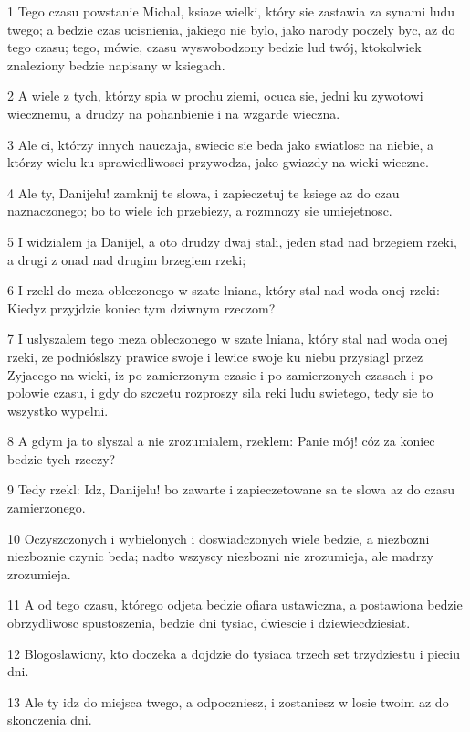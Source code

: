 \par 1 Tego czasu powstanie Michal, ksiaze wielki, który sie zastawia za synami ludu twego; a bedzie czas ucisnienia, jakiego nie bylo, jako narody poczely byc, az do tego czasu; tego, mówie, czasu wyswobodzony bedzie lud twój, ktokolwiek znaleziony bedzie napisany w ksiegach.
\par 2 A wiele z tych, którzy spia w prochu ziemi, ocuca sie, jedni ku zywotowi wiecznemu, a drudzy na pohanbienie i na wzgarde wieczna.
\par 3 Ale ci, którzy innych nauczaja, swiecic sie beda jako swiatlosc na niebie, a którzy wielu ku sprawiedliwosci przywodza, jako gwiazdy na wieki wieczne.
\par 4 Ale ty, Danijelu! zamknij te slowa, i zapieczetuj te ksiege az do czau naznaczonego; bo to wiele ich przebiezy, a rozmnozy sie umiejetnosc.
\par 5 I widzialem ja Danijel, a oto drudzy dwaj stali, jeden stad nad brzegiem rzeki, a drugi z onad nad drugim brzegiem rzeki;
\par 6 I rzekl do meza obleczonego w szate lniana, który stal nad woda onej rzeki: Kiedyz przyjdzie koniec tym dziwnym rzeczom?
\par 7 I uslyszalem tego meza obleczonego w szate lniana, który stal nad woda onej rzeki, ze podnióslszy prawice swoje i lewice swoje ku niebu przysiagl przez Zyjacego na wieki, iz po zamierzonym czasie i po zamierzonych czasach i po polowie czasu, i gdy do szczetu rozproszy sila reki ludu swietego, tedy sie to wszystko wypelni.
\par 8 A gdym ja to slyszal a nie zrozumialem, rzeklem: Panie mój! cóz za koniec bedzie tych rzeczy?
\par 9 Tedy rzekl: Idz, Danijelu! bo zawarte i zapieczetowane sa te slowa az do czasu zamierzonego.
\par 10 Oczyszczonych i wybielonych i doswiadczonych wiele bedzie, a niezbozni niezboznie czynic beda; nadto wszyscy niezbozni nie zrozumieja, ale madrzy zrozumieja.
\par 11 A od tego czasu, którego odjeta bedzie ofiara ustawiczna, a postawiona bedzie obrzydliwosc spustoszenia, bedzie dni tysiac, dwiescie i dziewiecdziesiat.
\par 12 Blogoslawiony, kto doczeka a dojdzie do tysiaca trzech set trzydziestu i pieciu dni.
\par 13 Ale ty idz do miejsca twego, a odpoczniesz, i zostaniesz w losie twoim az do skonczenia dni.


